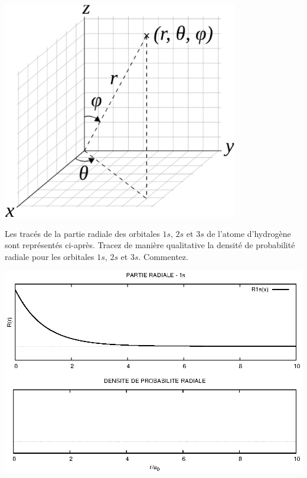 
\begin{center}
\includegraphics[height=9.5cm]{figure/spheriques.eps}\\
\end{center}


Les trac\'es de la partie radiale des orbitales $1s$, $2s$ et $3s$ de l'atome d'hydrog\`ene 
sont repr\'esent\'es ci-apr\`es.
Tracez de mani\`ere qualitative la densit\'e de probabilit\'e radiale pour les orbitales
$1s$, $2s$ et $3s$. Commentez. 

\clearpage
\begin{center}
\includegraphics[angle=90,width=\textwidth]{figure/rad1s.eps}
\end{center}
\clearpage

